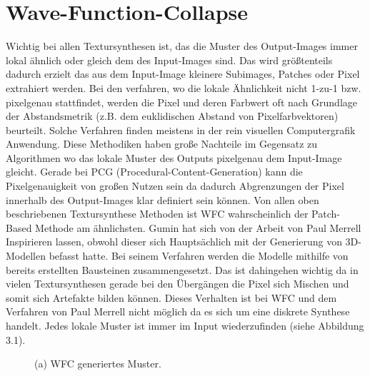 \documentclass[12pt, a4paper,twoside,openright]{report} %
\begin{document}
\chapter{Wave-Function-Collapse}

Wichtig bei allen Textursynthesen ist,
das die Muster des Output-Images immer lokal ähnlich oder gleich dem des Input-Images sind.
Das wird größtenteils dadurch erzielt das aus dem Input-Image kleinere Subimages, Patches oder Pixel extrahiert werden.
Bei den verfahren, wo die lokale Ähnlichkeit nicht 1-zu-1 bzw. pixelgenau stattfindet,
werden die Pixel und deren Farbwert oft nach Grundlage der Abstandsmetrik {(z.B. dem euklidischen Abstand von Pixelfarbvektoren)} beurteilt.
Solche Verfahren finden meistens in der rein visuellen Computergrafik Anwendung.
Diese Methodiken haben große Nachteile im Gegensatz zu Algorithmen wo das lokale Muster des Outputs pixelgenau dem Input-Image gleicht.
Gerade bei PCG {(Procedural-Content-Generation)} kann die Pixelgenauigkeit von großen Nutzen sein da dadurch Abgrenzungen der Pixel innerhalb des Output-Images klar definiert sein können.
\cite{Karth2017WaveFunctionCollapseIC}
Von allen oben beschriebenen Textursynthese Methoden ist WFC wahrscheinlich der Patch-Based Methode am ähnlichsten.
\newline
Gumin hat sich von der Arbeit von Paul Merrell Inspirieren lassen, obwohl dieser sich Hauptsächlich mit der Generierung von 3D-Modellen befasst hatte.
Bei seinem Verfahren werden die Modelle mithilfe von bereits erstellten Bausteinen zusammengesetzt.
Das ist dahingehen wichtig da in vielen Textursynthesen gerade bei den Übergängen die Pixel sich Mischen und somit sich Artefakte bilden können.
Dieses Verhalten ist bei WFC und dem Verfahren von Paul Merrell nicht möglich da es sich um eine diskrete Synthese handelt.
Jedes lokale Muster ist immer im Input wiederzufinden {(siehe Abbildung 3.1)}. \cite{Karth2017WaveFunctionCollapseIC, merrell2009model, Gumin_Wave_Function_Collapse_2016}

\begin{figure}[H]
    \centering
    \caption{(a) WFC generiertes Muster.}%
\end{figure}
\end{document}
